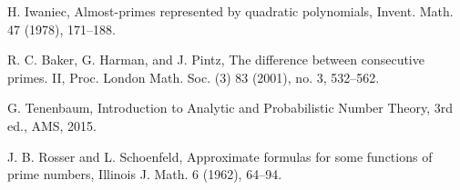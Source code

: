 \begin{thebibliography}{99}
H. Iwaniec, Almost-primes represented by quadratic polynomials, Invent. Math. 47 (1978), 171--188.

R. C. Baker, G. Harman, and J. Pintz, The difference between consecutive primes. II, Proc. London Math. Soc. (3) 83 (2001), no. 3, 532--562.

G. Tenenbaum, Introduction to Analytic and Probabilistic Number Theory, 3rd ed., AMS, 2015.

J. B. Rosser and L. Schoenfeld, Approximate formulas for some functions of prime numbers, Illinois J. Math. 6 (1962), 64--94.

\end{thebibliography}
